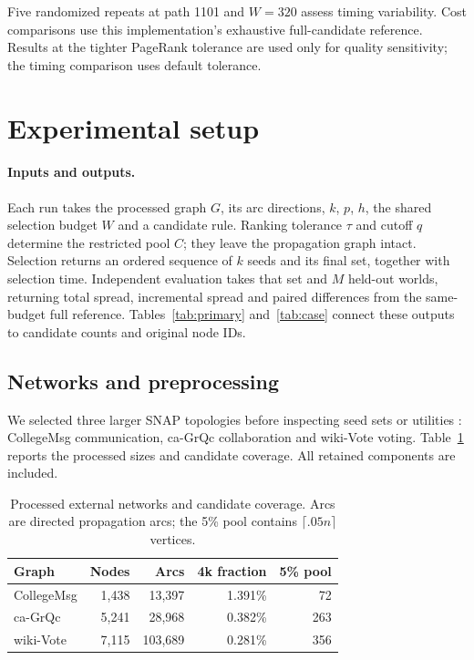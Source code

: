 \documentclass[smallextended]{svjour3}
\begin{document}
Five randomized repeats at path 1101 and $W=320$ assess timing variability. Cost comparisons use this implementation's exhaustive full-candidate reference. Results at the tighter PageRank tolerance are used only for quality sensitivity; the timing comparison uses default tolerance.

\section{Experimental setup}\label{sec:experimental-setup}
\paragraph{Inputs and outputs.} Each run takes the processed graph $G$, its arc directions, $k$, $p$, $h$, the shared selection budget $W$ and a candidate rule. Ranking tolerance $\tau$ and cutoff $q$ determine the restricted pool $C$; they leave the propagation graph intact. Selection returns an ordered sequence of $k$ seeds and its final set, together with selection time. Independent evaluation takes that set and $M$ held-out worlds, returning total spread, incremental spread and paired differences from the same-budget full reference. Tables~\ref{tab:primary} and~\ref{tab:case} connect these outputs to candidate counts and original node IDs.

\subsection{Networks and preprocessing}
We selected three larger SNAP topologies before inspecting seed sets or utilities \cite{snap}: CollegeMsg communication, ca-GrQc collaboration and wiki-Vote voting. Table~\ref{tab:data} reports the processed sizes and candidate coverage. All retained components are included.
\begin{table}[htbp]
\caption{Processed external networks and candidate coverage. Arcs are directed propagation arcs; the 5\% pool contains $\lceil .05n\rceil$ vertices.}\label{tab:data}
\begin{tabular}{lrrrr}
\toprule
Graph & Nodes & Arcs & 4k fraction & 5\% pool \\
\midrule
CollegeMsg & 1,438 & 13,397 & 1.391\% & 72 \\
ca-GrQc & 5,241 & 28,968 & 0.382\% & 263 \\
wiki-Vote & 7,115 & 103,689 & 0.281\% & 356 \\
\bottomrule
\end{tabular}
\end{table}
\end{document}
